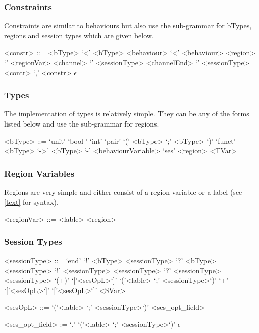 \subsubsection{Constraints}

Constraints are similar to behaviours but also use the sub-grammar for bTypes, regions and session types which are given below. 

\begin{grammar}

<constr> ::= <bType> `\textless' <bType>
\alt <behaviour> `\textless' <behaviour>
\alt <region> `\texttildelow' <regionVar>
\alt <channel> `\texttildelow' <sessionType>
\alt <channelEnd> `\texttildelow' <sessionType>
\alt <contr> `,' <constr>
\alt $\epsilon$

\end{grammar}

\subsubsection{Types}

The implementation of types is relatively simple. They can be any of the forms listed below and use the sub-grammar for regions. 
\begin{grammar}

<bType> ::= `unit'
\alt `bool '
\alt `int'
\alt `pair' `(' <bType> `;' <bType> `)'
\alt `funct' <bType> `->' <bType> `-' <behaviourVariable>
\alt `ses' <region>
\alt <TVar>

\end{grammar}

\subsubsection {Region Variables}

Regions are very simple and either consist of a region variable or a label (see \ref{text} for syntax). 

\begin{grammar}

<regionVar> ::= <lable>
\alt <region>

\end{grammar}

\subsubsection{Session Types}

\begin{grammar}

<sessionType> ::= `end'
\alt `!' <bType> <sessionType>
\alt `?' <bType> <sessionType>
\alt `!' <sessionType> <sessionType>
\alt `?' <sessionType> <sessionType>
\alt `(+)' `['<sesOpL>`]' `('<lable> `;' <sessionType>`)'
\alt `+' `['<sesOpL>`]' `['<sesOpL>`]'
\alt <SVar>

<sesOpL> ::= `('<lable> `;' <sessionType>`)' <ses_opt_field>

<ses_opt_field> := `,' `('<lable> `;' <sessionType>`)'
\alt $\epsilon$

\end{grammar}

